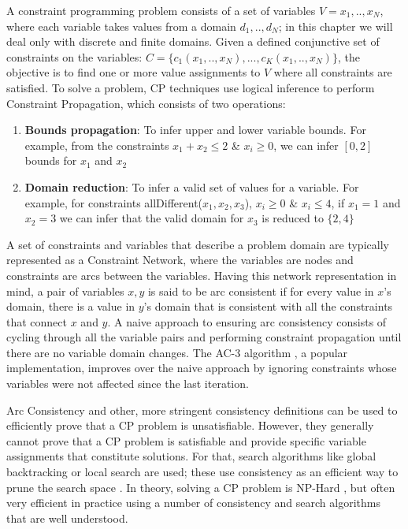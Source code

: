 A constraint programming problem consists of a set of variables $V=
{x_1,..,x_N}$, where each variable takes values from a domain
$d_1,..,d_N$; in this chapter we will deal only with discrete and
finite domains. Given a defined conjunctive set of constraints on the
variables: $C=\{c_1(x_1,..,x_N), ..., c_K(x_1,..,x_N)\}$, the
objective is to find one or more value assignments to $V$ where all
constraints are satisfied. To solve a problem, \textsf{CP} techniques use
logical inference to perform Constraint Propagation, which consists of
two operations:

\begin{enumerate}

\item \textbf{Bounds propagation}: To infer upper and lower variable
  bounds. For example, from the constraints $x_1 + x_2 \leq 2$ \&
  $x_i \geq 0$, we can infer $[0,2]$ bounds for $x_1$ and $x_2$

\item \textbf{Domain reduction}: To infer a valid set of values for a variable.
  For example, for  constraints allDifferent($x_1,x_2,x_3$), $x_i \geq
  0$ \& $x_i \leq 4$, if $x_1 = 1$ and $x_2 = 3$ we can infer that the
  valid domain for $x_3$ is reduced  to $\{2,4\}$

\end{enumerate}

A set of constraints and variables that describe a problem domain are
typically represented as a Constraint Network, where the variables are
nodes and constraints are arcs between the variables. Having this
network representation in mind, a pair of variables $x,y$ is said to
be arc consistent if for every value in $x$'s domain, there is a value
in $y$'s domain that is consistent with all the constraints that
connect $x$ and $y$.  A naive approach to ensuring arc consistency
consists of cycling through all the variable pairs and performing
constraint propagation until there are no variable domain changes. The
AC-3 algorithm \cite{mackworth77}, a popular implementation, improves
over the naive approach by ignoring constraints whose variables were
not affected since the last iteration. 

Arc Consistency and other, more stringent consistency definitions can
be used to efficiently prove that a \textsf{CP} problem is
unsatisfiable. However, they generally cannot prove that a \textsf{CP}
problem is satisfiable and provide specific variable assignments that
constitute solutions. For that, search algorithms like global
backtracking  or local search are used; these
use consistency as an efficient way to prune the search space
\cite{cp06}. In theory, solving a \textsf{CP} problem is NP-Hard
\cite{ghallab04}, but often very efficient in practice using a number
of consistency and search algorithms that are well understood.

